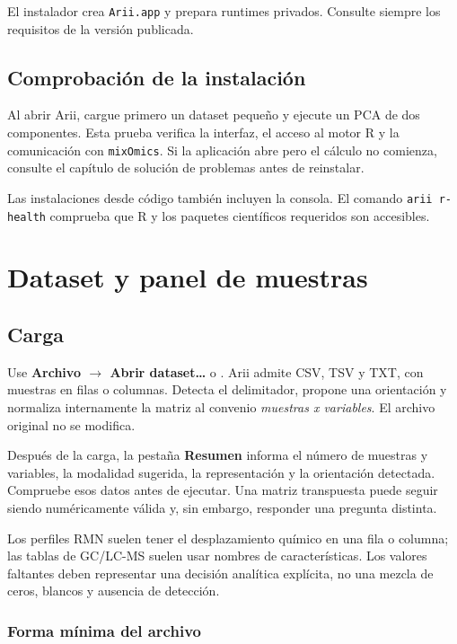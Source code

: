 \documentclass[11pt,a4paper,openany]{report}
\newcommand{\menu}[1]{\textbf{#1}}
\newcommand{\code}[1]{\texttt{#1}}
\newcommand{\tecla}[1]{\fbox{\strut\textsf{#1}}}
\begin{document}
El instalador crea \code{Arii.app} y prepara runtimes privados. Consulte siempre
los requisitos de la versión publicada.

\section{Comprobación de la instalación}

Al abrir Arii, cargue primero un dataset pequeño y ejecute un PCA de dos
componentes. Esta prueba verifica la interfaz, el acceso al motor R y la
comunicación con \code{mixOmics}. Si la aplicación abre pero el cálculo no
comienza, consulte el capítulo de solución de problemas antes de reinstalar.

Las instalaciones desde código también incluyen la consola. El comando
\code{arii r-health} comprueba que R y los paquetes científicos requeridos son
accesibles.

\chapter{Dataset y panel de muestras}

\section{Carga}

Use \menu{Archivo \texorpdfstring{$\rightarrow$}{ > } Abrir dataset…} o
\tecla{Ctrl+O}. Arii admite CSV, TSV y TXT,
con muestras en filas o columnas. Detecta el delimitador, propone una
orientación y normaliza internamente la matriz al convenio
\emph{muestras x variables}. El archivo original no se modifica.

Después de la carga, la pestaña \menu{Resumen} informa el número de muestras y
variables, la modalidad sugerida, la representación y la orientación detectada.
Compruebe esos datos antes de ejecutar. Una matriz transpuesta puede seguir
siendo numéricamente válida y, sin embargo, responder una pregunta distinta.

Los perfiles RMN suelen tener el desplazamiento químico en una fila o columna;
las tablas de GC/LC-MS suelen usar nombres de características. Los valores
faltantes deben representar una decisión analítica explícita, no una mezcla de
ceros, blancos y ausencia de detección.

\subsection{Forma mínima del archivo}
\end{document}
